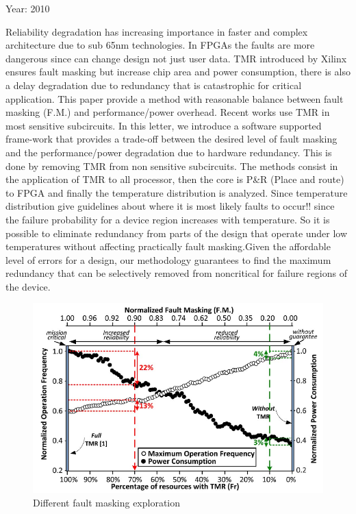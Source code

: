 {{		Year: 2010
		
		Reliability degradation has increasing importance in faster and complex architecture due to sub 65nm technologies. In FPGAs the faults are more dangerous since can change design not just user data. TMR introduced by Xilinx ensures fault masking but increase chip area and power consumption, there is also a delay degradation due to redundancy that is catastrophic for critical application. This paper provide a method with reasonable balance between fault masking (F.M.) and performance/power overhead. Recent works use TMR in most sensitive subcircuits.   
		In this letter, we introduce a software supported frame-work that provides a trade-off between the desired level of fault masking and the performance/power degradation due to hardware redundancy. This is done by removing TMR from non sensitive subcircuits. The methods consist in the application of TMR to all processor, then the core is P\&R (Place and route) to FPGA and finally the temperature distribution is analyzed. Since temperature distribution give guidelines about where it is most likely faults to occur!! since the failure probability for a device region increases with temperature. So it is possible to eliminate redundancy from parts of the design that operate under low temperatures without affecting practically fault masking.Given the affordable level of errors for a design, our methodology guarantees to find the maximum redundancy that can be selectively removed from noncritical for failure regions of the device.
		\begin{figure}[H]
			\centering
			\includegraphics[scale=0.4]{./images/Articles_image/Alleviate_TMR_preformance_degradation_1.png}
			\caption{Different fault masking exploration}
			\label{Interface}
		\end{figure}
	}
}
